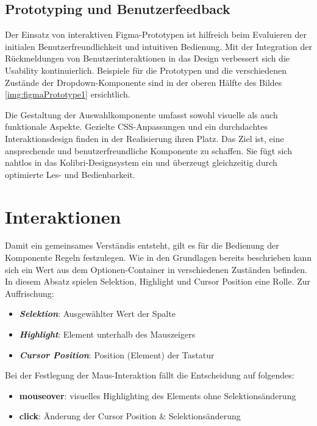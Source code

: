 \subsection{Prototyping und Benutzerfeedback}
\label{sec:userFeedbackPtototyping}

Der Einsatz von interaktiven Figma-Prototypen ist hilfreich beim Evaluieren der initialen Benutzerfreundlichkeit und intuitiven Bedienung. 
Mit der Integration der Rückmeldungen von Benutzerinteraktionen in das Design verbessert sich die Usability kontinuierlich. 
Beispiele für die Prototypen und die verschiedenen Zustände der Dropdown-Komponente sind in der oberen Hälfte des Bildes \ref{img:figmaPrototype1} ersichtlich. 

Die Gestaltung der Auswahlkomponente umfasst sowohl visuelle als auch funktionale Aspekte. 
Gezielte CSS-Anpassungen und ein durchdachtes Interaktionsdesign finden in der Realisierung ihren Platz. 
Das Ziel ist, eine ansprechende und benutzerfreundliche Komponente zu schaffen. 
Sie fügt sich nahtlos in das Kolibri-Designsystem ein und überzeugt gleichzeitig durch optimierte Les- und Bedienbarkeit. 


\section{Interaktionen} %
\label{sec:interaction}

Damit ein gemeinsames Verständis entsteht, gilt es für die Bedienung der Komponente Regeln festzulegen. 
Wie in den Grundlagen bereits beschrieben kann sich ein Wert aus dem Optionen-Container in verschiedenen Zuständen befinden. 
In diesem Absatz spielen Selektion, Highlight und Cursor Position eine Rolle. 
Zur Auffrischung: 

\begin{itemize}
    \item \textbf{\emph{Selektion}}: Ausgewählter Wert der Spalte
    \item \textbf{\emph{Highlight}}: Element unterhalb des Mauszeigers
    \item \textbf{\emph{Cursor Position}}: Position (Element) der Tastatur
\end{itemize}

\noindent
Bei der Festlegung der Maus-Interaktion fällt die Entscheidung auf folgendes:

\begin{itemize}
    \item \textbf{mouseover}: visuelles Highlighting des Elements ohne Selektionsänderung
    \item \textbf{click}: Änderung der Cursor Position \& Selektionsänderung
\end{itemize}

